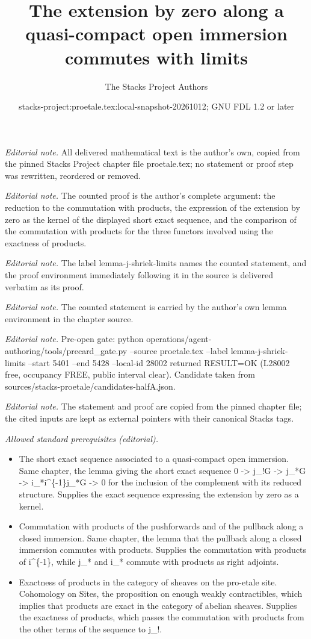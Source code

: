 \documentclass[10pt,a4paper]{amsart}
\title{The extension by zero along a quasi-compact open immersion commutes with limits}
\author{The Stacks Project Authors}
\date{stacks-project:proetale.tex:local-snapshot-20261012; GNU FDL 1.2 or later}
\theoremstyle{plain}
\theoremstyle{definition}
\theoremstyle{remark}
\numberwithin{equation}{subsection}
\begin{document}
\maketitle
\noindent\textit{Editorial note.} All delivered mathematical text is the author's own, copied from the pinned Stacks Project chapter file proetale.tex; no statement or proof step was rewritten, reordered or removed.\par\medskip
\noindent\textit{Editorial note.} The counted proof is the author's complete argument: the reduction to the commutation with products, the expression of the extension by zero as the kernel of the displayed short exact sequence, and the comparison of the commutation with products for the three functors involved using the exactness of products.\par\medskip
\noindent\textit{Editorial note.} The label lemma-j-shriek-limits names the counted statement, and the proof environment immediately following it in the source is delivered verbatim as its proof.\par\medskip
\noindent\textit{Editorial note.} The counted statement is carried by the author's own lemma environment in the chapter source.\par\medskip
\noindent\textit{Editorial note.} Pre-open gate: python operations/agent-authoring/tools/precard\_gate.py --source proetale.tex --label lemma-j-shriek-limits --start 5401 --end 5428 --local-id 28002 returned RESULT=OK (L28002 free, occupancy FREE, public interval clear). Candidate taken from sources/stacks-proetale/candidates-halfA.json.\par\medskip
\noindent\textit{Editorial note.} The statement and proof are copied from the pinned chapter file; the cited inputs are kept as external pointers with their canonical Stacks tags.\par\medskip
\noindent\textit{Allowed standard prerequisites (editorial).}\begin{itemize}
\item The short exact sequence associated to a quasi-compact open immersion. Same chapter, the lemma giving the short exact sequence 0 -> j\_!G -> j\_*G -> i\_*i\textasciicircum{}\{-1\}j\_*G -> 0 for the inclusion of the complement with its reduced structure. Supplies the exact sequence expressing the extension by zero as a kernel.
\item Commutation with products of the pushforwards and of the pullback along a closed immersion. Same chapter, the lemma that the pullback along a closed immersion commutes with products. Supplies the commutation with products of i\textasciicircum{}\{-1\}, while j\_* and i\_* commute with products as right adjoints.
\item Exactness of products in the category of sheaves on the pro-etale site. Cohomology on Sites, the proposition on enough weakly contractibles, which implies that products are exact in the category of abelian sheaves. Supplies the exactness of products, which passes the commutation with products from the other terms of the sequence to j\_!.
\end{itemize}\medskip
\end{document}
